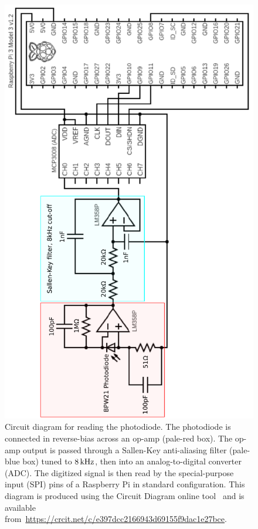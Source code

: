 \documentclass[aps,pra,superscriptaddress,reprint]{revtex4-2}
\begin{document}
\begin{figure}
	\includegraphics[angle=-90,width=.8\textwidth]{figures/circuit_diagram_2.pdf}
	\caption{\label{fig:circuit_diagram}
Circuit diagram for reading the photodiode. 
The photodiode is connected in reverse-bias across an op-amp (pale-red box). 
The op-amp output is passed through a Sallen-Key anti-aliasing filter (pale-blue box) tuned to $8\,{\rm kHz}$, then into an analog-to-digital converter (ADC). 
The digitized signal is then read by the special-purpose input (SPI) pins of a Raspberry Pi in standard configuration.
This diagram is produced using the Circuit Diagram online tool~\cite{CircuitDiagram:online} and is available from~\url{https://crcit.net/c/e397dcc2166943d69155f9dac1e27bce}.
}
\end{figure}
\end{document}
